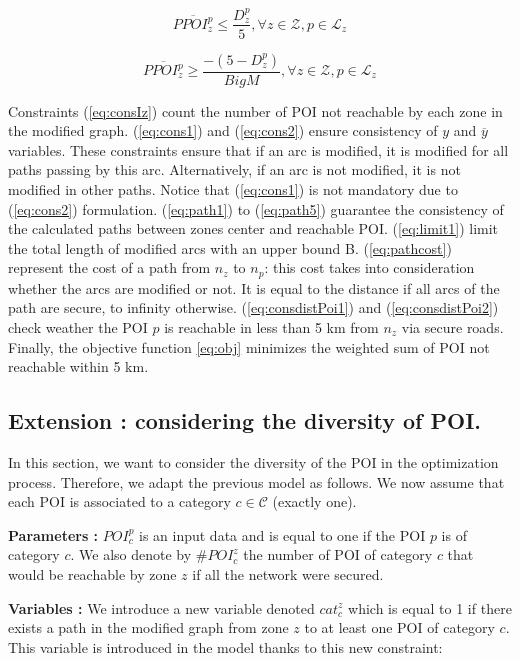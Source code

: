 \begin{equation}\label{eq:consdistPoi1}
    \overline{PPOI_z^p} \leq \frac{D_z^p}{5}, \forall z \in \mathcal{Z}, p \in \mathcal{L}_z 
\end{equation}

\begin{equation}\label{eq:consdistPoi2}
    \overline{PPOI_z^p} \geq \frac{-(5-D_z^p)}{BigM}, \forall z \in \mathcal{Z}, p \in \mathcal{L}_z 
\end{equation}

Constraints (\ref{eq:consIz}) count the number of POI not reachable by each zone in the modified graph. (\ref{eq:cons1}) and (\ref{eq:cons2}) ensure consistency of $y$ and $\overline{y}$ variables. These constraints ensure that if an arc is modified, it is modified for all paths passing by this arc. Alternatively, if an arc is not modified, it is not modified in other paths. Notice that (\ref{eq:cons1})  is not mandatory due to (\ref{eq:cons2}) formulation.  (\ref{eq:path1}) to (\ref{eq:path5}) guarantee the consistency of the calculated paths between zones center and reachable POI.  (\ref{eq:limit1}) limit the total length of modified arcs with an upper bound B. (\ref{eq:pathcost}) represent the  cost of a path from $n_z$ to $n_p$: this cost takes into consideration whether the arcs are modified or not. It is equal to the distance if all arcs of the path are secure, to infinity otherwise. (\ref{eq:consdistPoi1}) and (\ref{eq:consdistPoi2}) check weather the POI $p$ is reachable in less than 5 km from $n_z$ via secure roads. Finally, the objective function \ref{eq:obj} minimizes the weighted sum of POI not reachable within 5 km.

\subsection*{Extension : considering the diversity of POI.}

In this section, we want to consider the diversity of the POI in the optimization process. Therefore, we adapt the previous model as follows. We now assume that each POI is associated to a category $c \in \mathcal{C}$ (exactly one).

\textbf{Parameters :} $POI^p_c$ is an input data and is equal to one if the POI $p$ is of category $c$. We also denote by $\#POI^z_c$ the number of POI of category $c$ that would be reachable by zone $z$ if all the network were secured.

\textbf{Variables :} We introduce a new variable denoted $cat^z_c$ which is equal to 1 if there exists a path in the modified graph from zone $z$ to at least one POI of category $c$. This variable is introduced in the model thanks to this new constraint:

